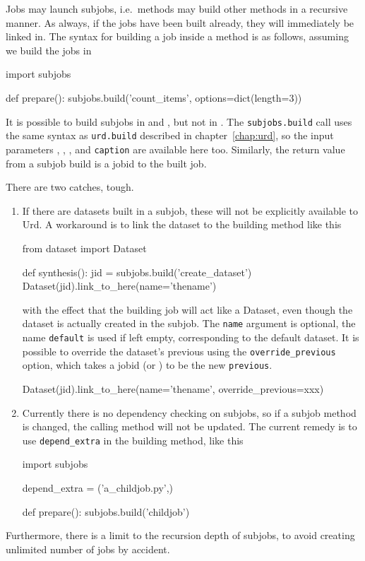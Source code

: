 Jobs may launch subjobs, i.e.\ methods may build other methods in a
recursive manner.  As always, if the jobs have been built already,
they will immediately be linked in.  The syntax for building a job
inside a method is as follows, assuming we build the jobs in \prepare
\begin{python}
import subjobs

def prepare():
  subjobs.build('count_items', options=dict(length=3))
\end{python}
It is possible to build subjobs in \prepare and \synthesis, but not in
\analysis.    The \texttt{subjobs.build} call uses the
same syntax as \texttt{urd.build} described in chapter~\ref{chap:urd}, so
the input parameters \options, \datasets, \jobids, and
\texttt{caption} are available here too.  Similarly, the return value
from a subjob build is a jobid to the built job.

There are two catches, tough.
\begin{enumerate}
  \item
If there are datasets built in a subjob,
these will not be explicitly available to Urd.  A workaround is to
link the dataset to the building method like this
\begin{python}
from dataset import Dataset

def synthesis():
    jid = subjobs.build('create_dataset')
    Dataset(jid).link_to_here(name='thename')
\end{python}
with the effect that the building job will act like a Dataset, even
though the dataset is actually created in the subjob.  The
\texttt{name} argument is optional, the name \texttt{default} is used
if left empty, corresponding to the default dataset.  It is possible
to override the dataset's previous using
the \texttt{override\_previous} option, which takes a jobid
(or \pyNone) to be the new \texttt{previous}.
\begin{python}
Dataset(jid).link_to_here(name='thename', override_previous=xxx)
\end{python}


\item
Currently there is no dependency checking on subjobs, so if a subjob
method is changed, the calling method will not be updated.  The
current remedy is to use \texttt{depend\_extra} in the building
method, like this
\begin{python}
import subjobs

depend_extra = ('a_childjob.py',)

def prepare():
  subjobs.build('childjob')
\end{python}
\end{enumerate}
Furthermore, there is a limit to the recursion depth of subjobs, to
avoid creating unlimited number of jobs by accident.



